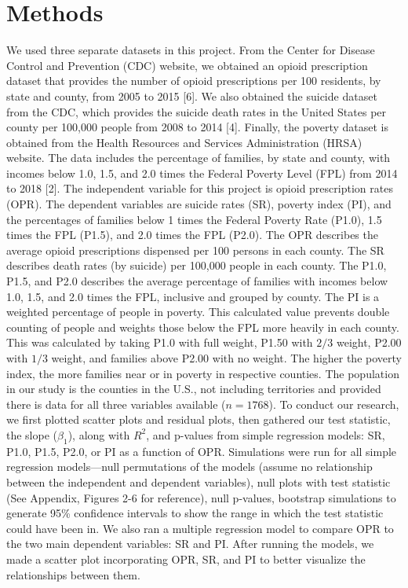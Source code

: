 \documentclass{article}
\newcommand{\<}{\langle}
\renewcommand{\>}{\rangle}
\theoremstyle{definition}
\begin{document}
\section*{Methods}
\hspace{\parindent} We used three separate datasets in this project. From the Center for Disease Control and Prevention (CDC) website, we obtained an opioid prescription dataset that provides the number of opioid prescriptions per 100 residents, by state and county, from 2005 to 2015 [6]. We also obtained the suicide dataset from the CDC, which provides the suicide death rates in the United States per county per 100,000 people from 2008 to 2014 [4]. Finally, the poverty dataset is obtained from the Health Resources and Services Administration (HRSA) website. The data includes the percentage of families, by state and county, with incomes below 1.0, 1.5, and 2.0 times the Federal Poverty Level (FPL) from 2014 to 2018 [2]. The independent variable for this project is opioid prescription rates (OPR).  The dependent variables are suicide rates (SR),   poverty index (PI), and the percentages of families below 1 times the Federal Poverty Rate (P1.0), 1.5 times the FPL (P1.5), and 2.0 times the FPL (P2.0). The OPR describes the average opioid prescriptions dispensed per 100 persons in each county. The SR describes death rates (by suicide) per 100,000 people in each county. The P1.0, P1.5, and P2.0 describes the average percentage of families with incomes below 1.0, 1.5, and 2.0 times the FPL, inclusive and grouped by county. The PI is a weighted percentage of people in poverty. This calculated value prevents double counting of people and weights those below the FPL more heavily in each county. This was calculated by taking P1.0 with full weight, P1.50 with $2/3$ weight, P2.00 with $1/3$ weight, and families above P2.00 with no weight. The higher the poverty index, the more families near or in poverty in respective counties. The population in our study is the counties in the U.S., not including territories and provided there is data for all three variables available ($n = 1768$). To conduct our research, we first plotted scatter plots and residual plots, then gathered our test statistic, the slope ($\beta_1$), along with $R^2$,  and p-values from simple regression models: SR, P1.0, P1.5, P2.0, or PI as a function of OPR. Simulations were run for all simple regression models—null permutations of the models (assume no relationship between the independent and dependent variables), null plots with test statistic (See Appendix, Figures 2-6 for reference), null p-values, bootstrap simulations to generate 95\% confidence intervals to show the range in which the test statistic could have been in. We also ran a multiple regression model to compare OPR to the two main dependent variables: SR and PI. After running the models, we made a scatter plot incorporating OPR, SR, and PI to better visualize the relationships between them.
\end{document}

